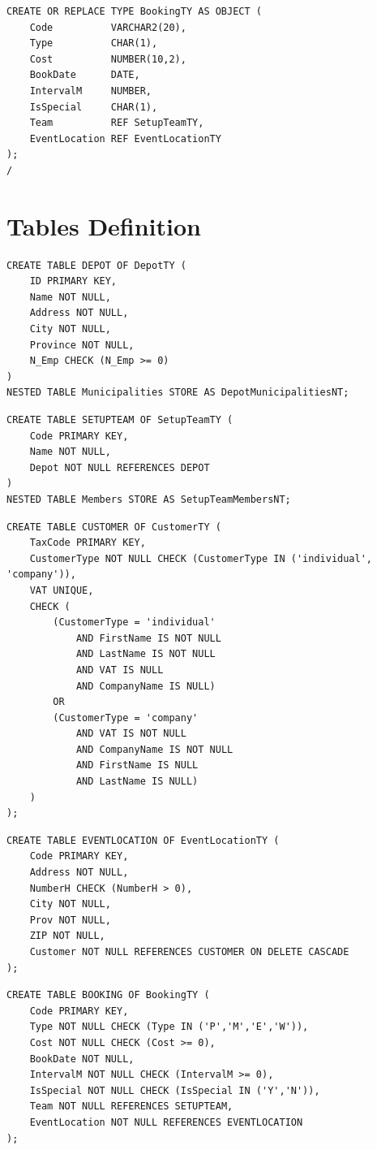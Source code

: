 \begin{lstlisting}
CREATE OR REPLACE TYPE BookingTY AS OBJECT (
    Code          VARCHAR2(20),
    Type          CHAR(1),
    Cost          NUMBER(10,2),
    BookDate      DATE,
    IntervalM     NUMBER,
    IsSpecial     CHAR(1),
    Team          REF SetupTeamTY,
    EventLocation REF EventLocationTY
);
/
\end{lstlisting}


\section{Tables Definition}


\begin{lstlisting}
CREATE TABLE DEPOT OF DepotTY (
    ID PRIMARY KEY,
    Name NOT NULL,
    Address NOT NULL,
    City NOT NULL,
    Province NOT NULL,
    N_Emp CHECK (N_Emp >= 0)
)
NESTED TABLE Municipalities STORE AS DepotMunicipalitiesNT;
\end{lstlisting}

\begin{lstlisting}
CREATE TABLE SETUPTEAM OF SetupTeamTY (
    Code PRIMARY KEY,
    Name NOT NULL,
    Depot NOT NULL REFERENCES DEPOT
)
NESTED TABLE Members STORE AS SetupTeamMembersNT;
\end{lstlisting}

\begin{lstlisting}
CREATE TABLE CUSTOMER OF CustomerTY (
    TaxCode PRIMARY KEY,
    CustomerType NOT NULL CHECK (CustomerType IN ('individual', 'company')),
    VAT UNIQUE,
    CHECK (
        (CustomerType = 'individual'
            AND FirstName IS NOT NULL
            AND LastName IS NOT NULL
            AND VAT IS NULL
            AND CompanyName IS NULL)
        OR
        (CustomerType = 'company'
            AND VAT IS NOT NULL
            AND CompanyName IS NOT NULL
            AND FirstName IS NULL
            AND LastName IS NULL)
    )
);
\end{lstlisting}

\begin{lstlisting}
CREATE TABLE EVENTLOCATION OF EventLocationTY (
    Code PRIMARY KEY,
    Address NOT NULL,
    NumberH CHECK (NumberH > 0),
    City NOT NULL,
    Prov NOT NULL,
    ZIP NOT NULL,
    Customer NOT NULL REFERENCES CUSTOMER ON DELETE CASCADE
);
\end{lstlisting}

\begin{lstlisting}
CREATE TABLE BOOKING OF BookingTY (
    Code PRIMARY KEY,
    Type NOT NULL CHECK (Type IN ('P','M','E','W')),
    Cost NOT NULL CHECK (Cost >= 0),
    BookDate NOT NULL,
    IntervalM NOT NULL CHECK (IntervalM >= 0),
    IsSpecial NOT NULL CHECK (IsSpecial IN ('Y','N')),
    Team NOT NULL REFERENCES SETUPTEAM,
    EventLocation NOT NULL REFERENCES EVENTLOCATION
);
\end{lstlisting}

